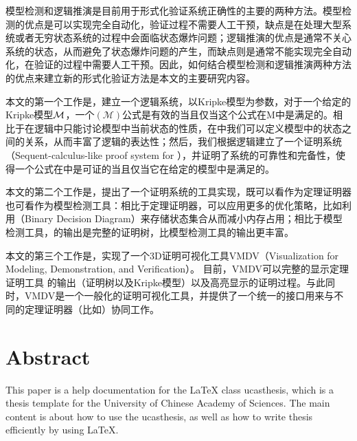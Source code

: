 模型检测和逻辑推演是目前用于形式化验证系统正确性的主要的两种方法。模型检测的优点是可以实现完全自动化，验证过程不需要人工干预，缺点是在处理大型系统或者无穷状态系统的过程中会面临状态爆炸问题；逻辑推演的优点是通常不关心系统的状态，从而避免了状态爆炸问题的产生，而缺点则是通常不能实现完全自动化，在验证的过程中需要人工干预。因此，如何结合模型检测和逻辑推演两种方法的优点来建立新的形式化验证方法是本文的主要研究内容。

本文的第一个工作是，建立一个逻辑系统\CTLP{}，\CTLP{}以Kripke模型为参数，对于一个给定的Kripke模型$\cal M$，一个\CTLP$(\mathcal{M})$公式是有效的当且仅当这个公式在M中是满足的。相比于在\CTL{}逻辑中只能讨论模型中当前状态的性质，在\CTLP{}中我们可以定义模型中的状态之间的关系，从而丰富了\CTL{}逻辑的表达性；然后，我们根据逻辑\CTLP{}建立了一个证明系统\SCTL{}（Sequent-calculus-like proof system for \CTLP{}），并证明了\SCTL{}系统的可靠性和完备性，使得一个公式在\SCTL{}中是可证的当且仅当它在给定的模型中是满足的。

本文的第二个工作是，提出了一个\SCTL{}证明系统的工具实现\sctlprov{}，\sctlprov{}既可以看作为定理证明器也可看作为模型检测工具：相比于定理证明器，\sctlprov{}可以应用更多的优化策略，比如利用\BDD{}（Binary Decision Diagram）来存储状态集合从而减小内存占用；相比于模型检测工具，\sctlprov{}的输出是完整的证明树，比模型检测工具的输出更丰富。

本文的第三个工作是，实现了一个3D证明可视化工具\textsf{VMDV}（Visualization for Modeling, Demonstration, and Verification）。 目前，\textsf{VMDV}可以完整的显示定理证明工具 \sctlprov{} 的输出（证明树以及Kripke模型）以及高亮显示\sctlprov{}的证明过程。与此同时，\textsf{VMDV}是一个一般化的证明可视化工具，并提供了一个统一的接口用来与不同的定理证明器（比如）协同工作。


\chapter*{Abstract}%

This paper is a help documentation for the \LaTeX{} class ucasthesis, which is  a thesis template for the University of Chinese Academy of Sciences. The main content is about how to use the ucasthesis, as well as how to write thesis efficiently by using \LaTeX{}.

